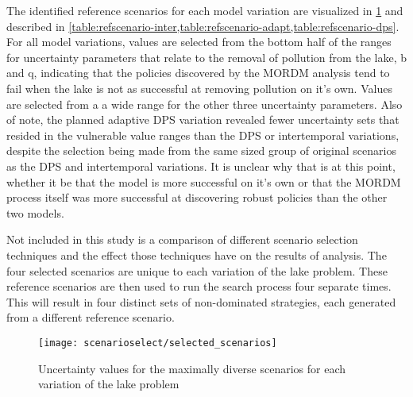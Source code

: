     The identified reference scenarios for each model variation are visualized in \cref{fig:selected-scenarios} and described in \cref{table:refscenario-inter,table:refscenario-adapt,table:refscenario-dps}. For all model variations, values are selected from the bottom half of the ranges for uncertainty parameters that relate to the removal of pollution from the lake, b and q, indicating that the policies discovered by the MORDM analysis tend to fail when the lake is not as successful at removing pollution on it's own. Values are selected from a a wide range for the other three uncertainty parameters. Also of note, the planned adaptive DPS variation revealed fewer uncertainty sets that resided in the vulnerable value ranges than the DPS or intertemporal variations, despite the selection being made from the same sized group of original scenarios as the DPS and intertemporal variations. It is unclear why that is at this point, whether it be that the model is more successful on it's own or that the MORDM process itself was more successful at discovering robust policies than the other two models. 
    
    Not included in this study is a comparison of different scenario selection techniques and the effect those techniques have on the results of analysis. The four selected scenarios are unique to each variation of the lake problem. These reference scenarios are then used to run the search process four separate times. This will result in four distinct sets of non-dominated strategies, each generated from a different reference scenario. 
    
    \begin{figure}[H]
        \centering
        \captionsetup{width=0.75\linewidth}
        
        \texttt{[image: scenarioselect/selected\_scenarios]}
        \caption[Uncertainty values used to select reference scenarios for multi-scenario MORDM]{Uncertainty values for the maximally diverse scenarios for each variation of the lake problem}
        \label{fig:selected-scenarios}
    \end{figure}
    
